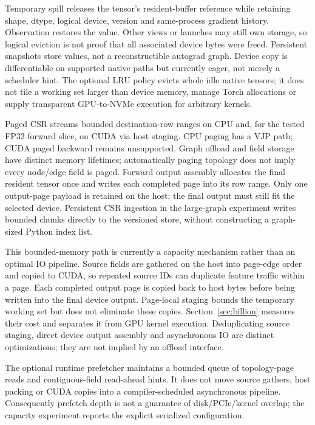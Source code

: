 Temporary spill releases the tensor's resident-buffer reference while retaining
shape, dtype, logical device, version and same-process gradient history.
Observation restores the value. Other views or launches may still own storage,
so logical eviction is not proof that all associated device bytes were freed.
Persistent snapshots store values, not a reconstructible autograd graph. Device
copy is differentiable on supported native paths but currently eager, not merely
a scheduler hint. The optional LRU policy evicts whole idle native tensors; it
does not tile a working set larger than device memory, manage Torch allocations
or supply transparent GPU-to-NVMe execution for arbitrary kernels.

Paged CSR streams bounded destination-row ranges on CPU and, for the tested
FP32 forward slice, on CUDA via host staging. CPU paging has a VJP path;
CUDA paged backward remains unsupported. Graph offload and
field storage have distinct memory lifetimes; automatically paging topology
does not imply every node/edge field is paged. Forward output assembly allocates
the final resident tensor once and writes each completed page into its row
range. Only one output-page payload is retained on the host; the final output
must still fit the selected device. Persistent CSR ingestion in the large-graph
experiment writes bounded chunks directly to the versioned store, without
constructing a graph-sized Python index list.

This bounded-memory path is currently a capacity mechanism rather than an
optimal IO pipeline. Source fields are gathered on the host into page-edge
order and copied to CUDA, so repeated source IDs can duplicate feature traffic
within a page. Each completed output page is copied back to host bytes before
being written into the final device output. Page-local staging bounds the
temporary working set but does not eliminate these copies. Section~\ref{sec:billion} measures their
cost and separates it from GPU kernel execution. Deduplicating source staging,
direct device output assembly and asynchronous IO are distinct optimizations;
they are not implied by an offload interface.

The optional runtime prefetcher maintains a bounded queue of topology-page
reads and contiguous-field read-ahead hints. It does not move source gathers,
host packing or CUDA copies into a compiler-scheduled asynchronous pipeline.
Consequently prefetch depth is not a guarantee of disk/PCIe/kernel overlap;
the capacity experiment reports the explicit serialized configuration.

